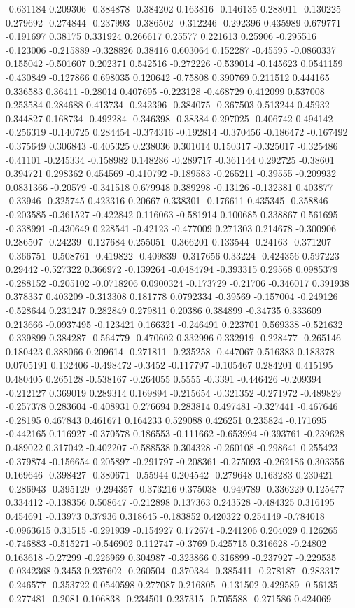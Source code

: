 -0.631184 0.209306 -0.384878 -0.384202 0.163816 -0.146135 0.288011 -0.130225 0.279692 -0.274844 -0.237993 -0.386502 -0.312246 -0.292396 0.435989 0.679771 -0.191697 0.38175 0.331924 0.266617 0.25577 0.221613 0.25906 -0.295516 -0.123006 -0.215889 -0.328826 0.38416 0.603064 0.152287 -0.45595 -0.0860337 0.155042 -0.501607 0.202371 0.542516 -0.272226 -0.539014 -0.145623 0.0541159 -0.430849 -0.127866 0.698035 0.120642 -0.75808 0.390769 0.211512 0.444165 0.336583 0.36411 -0.28014 0.407695 -0.223128 -0.468729 0.412099 0.537008 0.253584 0.284688 0.413734 -0.242396 -0.384075 -0.367503 0.513244 0.45932 0.344827 0.168734 -0.492284 -0.346398 -0.38384 0.297025 -0.406742 0.494142 -0.256319 -0.140725 0.284454 -0.374316 -0.192814 -0.370456 -0.186472 -0.167492 -0.375649 0.306843 -0.405325 0.238036 0.301014 0.150317 -0.325017 -0.325486 -0.41101 -0.245334 -0.158982 0.148286 -0.289717 -0.361144 0.292725 -0.38601 0.394721 0.298362 0.454569 -0.410792 -0.189583 -0.265211 -0.39555 -0.209932 0.0831366 -0.20579 -0.341518 0.679948 0.389298 -0.13126 -0.132381 0.403877 -0.33946 -0.325745 0.423316 0.20667 0.338301 -0.176611 0.435345 -0.358846 -0.203585 -0.361527 -0.422842 0.116063 -0.581914 0.100685 0.338867 0.561695 -0.338991 -0.430649 0.228541 -0.42123 -0.477009 0.271303 0.214678 -0.300906 0.286507 -0.24239 -0.127684 0.255051 -0.366201 0.133544 -0.24163 -0.371207 -0.366751 -0.508761 -0.419822 -0.409839 -0.317656 0.33224 -0.424356 0.597223 0.29442 -0.527322 0.366972 -0.139264 -0.0484794 -0.393315 0.29568 0.0985379 -0.288152 -0.205102 -0.0718206 0.0900324 -0.173729 -0.21706 -0.346017 0.391938 0.378337 0.403209 -0.313308 0.181778 0.0792334 -0.39569 -0.157004 -0.249126 -0.528644 0.231247 0.282849 0.279811 0.20386 0.384899 -0.34735 0.333609 0.213666 -0.0937495 -0.123421 0.166321 -0.246491 0.223701 0.569338 -0.521632 -0.339899 0.384287 -0.564779 -0.470602 0.332996 0.332919 -0.228477 -0.265146 0.180423 0.388066 0.209614 -0.271811 -0.235258 -0.447067 0.516383 0.183378 0.0705191 0.132406 -0.498472 -0.3452 -0.117797 -0.105467 0.284201 0.415195 0.480405 0.265128 -0.538167 -0.264055 0.5555 -0.3391 -0.446426 -0.209394 -0.212127 0.369019 0.289314 0.169894 -0.215654 -0.321352 -0.271972 -0.489829 -0.257378 0.283604 -0.408931 0.276694 0.283814 0.497481 -0.327441 -0.467646 -0.28195 0.467843 0.461671 0.164233 0.529088 0.426251 0.235824 -0.171695 -0.442165 0.116927 -0.370578 0.186553 -0.111662 -0.653994 -0.393761 -0.239628 0.489022 0.317042 -0.402207 -0.588538 0.304328 -0.260108 -0.298641 0.255423 -0.379874 -0.156654 0.205897 -0.291797 -0.208361 -0.275093 -0.262186 0.303356 0.169646 -0.398427 -0.380671 -0.55944 0.204542 -0.279648 0.163283 0.230421 -0.286943 -0.395129 -0.294357 -0.373216 0.375038 -0.949789 -0.336229 0.125477 0.334412 -0.138356 0.508647 -0.212898 0.137363 0.243528 -0.484325 0.316195 0.454691 -0.13973 0.37936 0.318645 -0.183852 0.420322 0.254149 -0.784018 -0.0963615 0.31515 -0.291939 -0.154927 0.172674 -0.241206 0.204029 0.126265 -0.746883 -0.515271 -0.546902 0.112747 -0.3769 0.425715 0.316628 -0.24802 0.163618 -0.27299 -0.226969 0.304987 -0.323866 0.316899 -0.237927 -0.229535 -0.0342368 0.3453 0.237602 -0.260504 -0.370384 -0.385411 -0.278187 -0.283317 -0.246577 -0.353722 0.0540598 0.277087 0.216805 -0.131502 0.429589 -0.56135 -0.277481 -0.2081 0.106838 -0.234501 0.237315 -0.705588 -0.271586 0.424069 